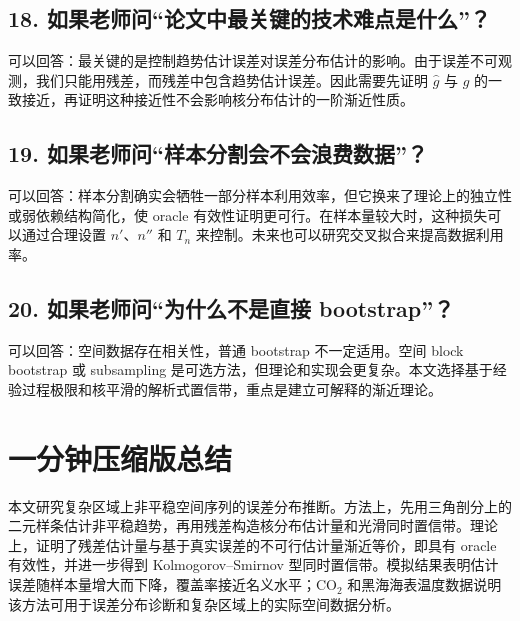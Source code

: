\documentclass[UTF8,12pt]{ctexart}
\begin{document}
\subsection*{18. 如果老师问“论文中最关键的技术难点是什么”？}
可以回答：最关键的是控制趋势估计误差对误差分布估计的影响。由于误差不可观测，我们只能用残差，而残差中包含趋势估计误差。因此需要先证明 \(\hat g\) 与 \(g\) 的一致接近，再证明这种接近性不会影响核分布估计的一阶渐近性质。

\subsection*{19. 如果老师问“样本分割会不会浪费数据”？}
可以回答：样本分割确实会牺牲一部分样本利用效率，但它换来了理论上的独立性或弱依赖结构简化，使 oracle 有效性证明更可行。在样本量较大时，这种损失可以通过合理设置 \(n'\)、\(n''\) 和 \(T_n\) 来控制。未来也可以研究交叉拟合来提高数据利用率。

\subsection*{20. 如果老师问“为什么不是直接 bootstrap”？}
可以回答：空间数据存在相关性，普通 bootstrap 不一定适用。空间 block bootstrap 或 subsampling 是可选方法，但理论和实现会更复杂。本文选择基于经验过程极限和核平滑的解析式置信带，重点是建立可解释的渐近理论。

\newpage
\section{一分钟压缩版总结}

本文研究复杂区域上非平稳空间序列的误差分布推断。方法上，先用三角剖分上的二元样条估计非平稳趋势，再用残差构造核分布估计量和光滑同时置信带。理论上，证明了残差估计量与基于真实误差的不可行估计量渐近等价，即具有 oracle 有效性，并进一步得到 Kolmogorov--Smirnov 型同时置信带。模拟结果表明估计误差随样本量增大而下降，覆盖率接近名义水平；CO\(_2\) 和黑海海表温度数据说明该方法可用于误差分布诊断和复杂区域上的实际空间数据分析。
\end{document}
